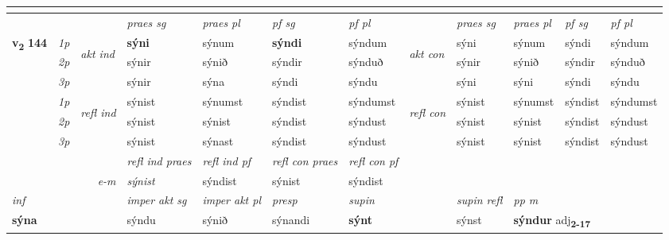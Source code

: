\begin{longtable}[l]{X>{\footnotesize\itshape}llXXXXlXXXX}
\midrule
  & \\
   \midrule
 & &   & \textit{praes sg}  & \textit{praes pl}    & \textit{ pf sg} & \textit{pf pl} & & \textit{praes sg}  & \textit{praes pl}    & \textit{pf sg} & \textit{pf pl }  \\ \cmidrule{4-7} \cmidrule{9-12}
 \multirow{2}{*}{{{\textbf{v{\textsubscript{2}}} \Large{\textbf{144}}}}}  & 1p & \multirow{3}{*}{\begin{turn}{90}\textit{akt ind}\end{turn}} & \textbf{sýni} & sýnum & \textbf{sýndi} & sýndum & \multirow{3}{*}{\begin{turn}{90}\textit{akt con}\end{turn}} &sýni & sýnum & sýndi & sýndum\\*
 & 2p &  &  sýnir  & sýnið & sýndir & sýnduð & & sýnir & sýnið & sýndir & sýnduð \\*
 & 3p &  & sýnir & sýna & sýndi & sýndu & & sýni & sýni& sýndi & sýndu \\*
\cmidrule{4-7} \cmidrule{9-12}
 & 1p & \multirow{3}{*}{\begin{turn}{90}\textit{refl ind}\end{turn}}  & sýnist & sýnumst & sýndist & sýndumst & \multirow{3}{*}{\begin{turn}{90}\textit{refl con}\end{turn}}  &sýnist & sýnumst & sýndist & sýndumst \\*
 & 2p &  & sýnist & sýnist & sýndist & sýndust & &sýnist & sýnist & sýndist & sýndust \\*
 & 3p  & & sýnist & sýnast & sýndist & sýndust & & sýnist & sýnist& sýndist & sýndust \\*
\cmidrule{4-7} \cmidrule{9-12}

 & && \textit{refl ind praes} & \textit{refl ind pf} & \textit{refl con praes} & \textit{refl con pf} \\*
\multicolumn{3}{r}{\textit{e-m}}& sýnist & sýndist & sýnist & sýndist \\*

\cmidrule{4-7}
   {\textit{inf}} & &  & \textit{imper akt sg} & \textit{imper akt pl}   & \textit{presp} & \textit{supin} && \textit{supin refl} & \textit{pp m} \\*
  {\textbf{sýna}} & && sýndu  & sýnið   & sýnandi &  \textbf{sýnt} && sýnst & \multicolumn{2}{l}{\textbf{sýndur} adj\textbf{\textsubscript{2-17}}} \\*

\midrule


\end{longtable}
